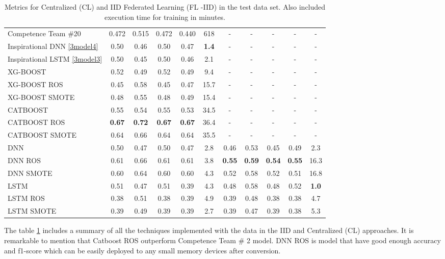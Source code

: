 \begin{table}[ht]
\begin{center}
\begin{adjustbox}{width=\textwidth}
\begin{tabular}{|l|*{5}{c}|*{5}{c}|}
\multicolumn{1}{|l|}{Competence Team \#20 \cite{team_20}} & 0.472 & 0.515 & 0.472 & 0.440 & 618 & - & - & - & - & - \\
\multicolumn{1}{|l|}{Inspirational DNN \ref{3model4}} & 0.50 & 0.46 & 0.50 & 0.47 & \textbf{1.4} & - & - & - & - & -  \\
\multicolumn{1}{|l|}{Inspirational LSTM \ref{3model3}} & 0.50 & 0.45 & 0.50 & 0.46 & 2.1 & - & - & - & - & -  \\
\hline\hline
\multicolumn{1}{|l|}{XG-BOOST} & 0.52 & 0.49 & 0.52 & 0.49 & 9.4 & - & - & - & - & -  \\
\multicolumn{1}{|l|}{XG-BOOST ROS} & 0.45 & 0.58 & 0.45 & 0.47 & 15.7 & - & - & - & - & - \\ 
\multicolumn{1}{|l|}{XG-BOOST SMOTE} & 0.48 & 0.55 & 0.48 & 0.49 & 15.4 & - & - & - & - & -  \\
\multicolumn{1}{|l|}{CATBOOST} & 0.55 & 0.54 & 0.55 & 0.53 & 34.5 & - & - & - & - & - \\
\multicolumn{1}{|l|}{CATBOOST ROS} & \textbf{0.67} & \textbf{0.72} &\textbf{ 0.67 }& \textbf{0.67} & 36.4 & - & - & - & - & -  \\
\multicolumn{1}{|l|}{CATBOOST SMOTE} & 0.64 & 0.66 & 0.64 & 0.64 & 35.5 & - & - & - & - & -  \\
\hline\hline
\multicolumn{1}{|l|}{DNN} & 0.50 & 0.47 & 0.50 & 0.47 & 2.8 & 0.46 & 0.53 & 0.45 & 0.49 & 2.3  \\
\multicolumn{1}{|l|}{DNN ROS} & 0.61 & 0.66 & 0.61 & 0.61 & 3.8 & \textbf{0.55} & \textbf{0.59} & \textbf{0.54} & \textbf{0.55} & 16.3  \\
\multicolumn{1}{|l|}{DNN SMOTE} & 0.60 & 0.64 & 0.60 & 0.60 & 4.3 & 0.52 & 0.58 & 0.52 & 0.51 & 16.8  \\
\hline\hline
\multicolumn{1}{|l|}{LSTM} & 0.51 & 0.47 & 0.51 & 0.39 & 4.3 & 0.48 & 0.58 & 0.48 & 0.52 & \textbf{1.0}  \\ 
\multicolumn{1}{|l|}{LSTM ROS} & 0.38 & 0.51 & 0.38 & 0.39 & 4.9 & 0.39 & 0.48 & 0.38 & 0.38 & 4.7  \\
\multicolumn{1}{|l|}{LSTM SMOTE} & 0.39 & 0.49 & 0.39 & 0.39 & 2.7 & 0.39 & 0.47 & 0.39 & 0.38 & 5.3  \\
\hline
\end{tabular}
\end{adjustbox}
\end{center}
\caption{Metrics for Centralized (CL) and IID Federated Learning (FL -IID) in the test data set. Also included execution time for training in minutes.}
\label{table:metrics_CL_FLIID}
\end{table}

The table \ref{table:metrics_CL_FLIID} includes a summary of all the techniques implemented with the data in the IID and Centralized (CL) approaches. It is remarkable to mention that Catboost ROS outperform Competence Team \# 2 model. DNN ROS is model that have good enough accuracy and f1-score which can be easily deployed to any small memory devices after conversion.  